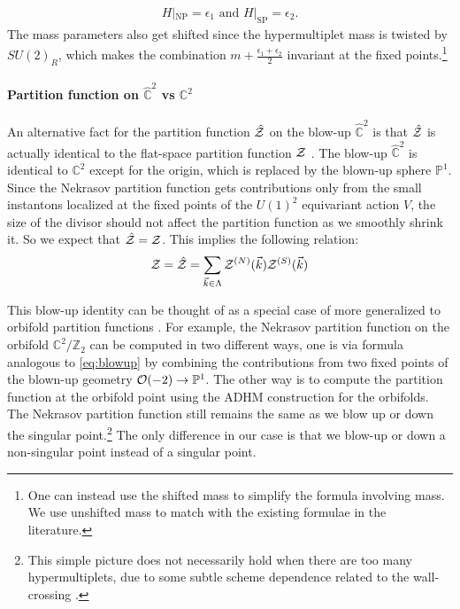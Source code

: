\documentclass[letterpaper, 11pt]{article}
\def\IC{\mathbb{C}}
\def\IP{\mathbb{P}}
\def\IZ{\mathbb{Z}}
\def\CO{{\cal O}}
\def\CZ{{\cal Z}}
\def\e{\epsilon}
\begin{document}
\begin{align}
  H|_\text{NP} = \epsilon_1 \text{ and } H|_\text{SP} = \epsilon_2.
\end{align}
The mass parameters also get shifted since the hypermultiplet mass is twisted by $SU(2)_R$, which makes the combination $m + \frac{\e_1+\e_2}{2}$ invariant at the fixed points.\footnote{One can instead use the shifted mass to simplify the formula involving mass. We use unshifted mass to match with the existing formulae in the literature.} 

\paragraph{Partition function on $\hat{\IC}^2$ vs $\IC^2$}
An alternative fact for the partition function $\hat{\CZ}$ on the blow-up $\hat{\IC}^2$ is that $\hat{\CZ}$ is actually identical to the flat-space partition function $\CZ$  \cite{Nakajima:2003pg, Nakajima:2003uh,Nakajima:2005fg}.
The blow-up $\hat{\IC}^2$ is identical to $\IC^2$ except for the origin, which is replaced by the blown-up sphere $\IP^1$. 
Since the Nekrasov partition function gets contributions only from the small instantons localized at the fixed points of the $U(1)^2$ equivariant action $V$, the size of the divisor should not affect the partition function as we smoothly shrink it. So we expect that $\hat{\CZ} = \CZ$. This implies the following relation: \cite{Nakajima:2003pg, Nakajima:2003uh,Nakajima:2005fg,Keller:2012da,Gu:2018gmy,Gu:2019dan}
\begin{align} 
  \label{eq:blowup-generic}
  \CZ = \hat{\CZ} = \sum_{\vec{k} \in \Lambda} \CZ^{(N)}(\vec{k}) \CZ^{(S)}(\vec{k})
\end{align}

This blow-up identity can be thought of as a special case of more generalized to orbifold partition functions \cite{Sasaki:2006vq,Bonelli:2012ny,Ito:2013kpa}. %
For example, the Nekrasov partition function on the orbifold $\IC^2/\IZ_2$ can be computed in two different ways, one is via formula analogous to \eqref{eq:blowup} by combining the contributions from two fixed points of the blown-up geometry $\CO(-2) \to \IP^1$. The other way is to compute the partition function at the orbifold point using the ADHM construction for the orbifolds. The Nekrasov partition function still remains the same as we blow up or down the singular point.\footnote{This simple picture does not necessarily hold when there are too many hypermultiplets, due to some subtle scheme dependence related to the wall-crossing \cite{Ito:2013kpa}.} 
The only difference in our case is that we blow-up or down a non-singular point instead of a singular point. 
\end{document}
